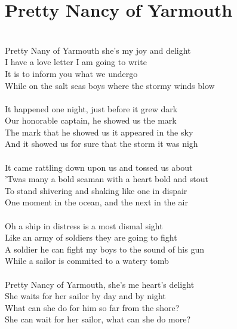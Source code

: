 \documentclass[letterpaper,9pt]{article}
\begin{document}
\section{Pretty Nancy of Yarmouth}
\noindent
\\Pretty Nany of Yarmouth she's my joy and delight
\\I have a love letter I am going to write
\\It is to inform you what we undergo
\\While on the salt seas boys where the stormy winds blow
\\
\\It happened one night, just before it grew dark
\\Our honorable captain, he showed us the mark
\\The mark that he showed us it appeared in the sky
\\And it showed us for sure that the storm it was nigh
\\
\\It came rattling down upon us and tossed us about
\\'Twas many a bold seaman with a heart bold and stout
\\To stand shivering and shaking like one in dispair
\\One moment in the ocean, and the next in the air
\\
\\Oh a ship in distress is a most dismal sight
\\Like an army of soldiers they are going to fight
\\A soldier he can fight my boys to the sound of his gun
\\While a sailor is commited to a watery tomb
\\
\\Pretty Nancy of Yarmouth, she's me heart's delight
\\She waits for her sailor by day and by night
\\What can she do for him so far from the shore?
\\She can wait for her sailor, what can she do more?
\end{document}
